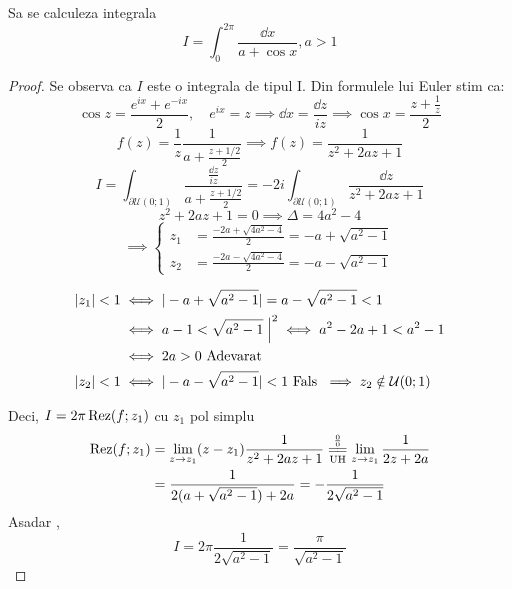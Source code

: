     \begin{aplicatie}
        Sa se calculeza integrala
        \[
            I = \int_{0}^{2 \pi} \frac{\dd x}{a + \cos x}, a>1
        \]
        \begin{proof}
            Se observa ca $I$ este o integrala de tipul $\mathrm{I}$.
            Din formulele lui Euler stim ca:
            \[
                \cos z = \frac{e^{ix}+e^{-ix}}{2}
                , \quad e^{ix} = z \implies \dd x = \frac{\dd z}{iz}
                        \implies \cos x = \frac{z+\frac{1}{z}}{2}
            \]
            \[
                f(z) = \frac{1}{z} \frac{1}{a + \frac{z + 1/2}{2}}
                \implies f(z) = \frac{1}{z^2 + 2az + 1}
            \]
            \[
                I = \int_{\partial\mathcal{U}(0;1)} \frac{\frac{\dd z}{iz}}{a + \frac{z + 1/2}{2}}
                  = - 2i \int_{\partial\mathcal{U}(0;1)} \frac{\dd z}{z^2 + 2az + 1}
            \]
            \[
                z^2 + 2az + 1 = 0 \implies \Delta = 4 a^2 - 4
            \]
            \[
                \implies \left \{
                \begin{aligned}
                    z_1 &= \frac{-2a + \sqrt{4a^2-4}}{2} = -a + \sqrt{a^2 - 1}  \\
                    z_2 &= \frac{-2a - \sqrt{4a^2-4}}{2} = -a - \sqrt{a^2 - 1}
                \end{aligned}
                \right .
            \]

            \begin{align*}
                |z_1| < 1 &\iff |-a + \sqrt{a^2 - 1 }| = a - \sqrt{a^2 -1} < 1 \\
                          &\iff a-1 < \sqrt{a^2 -1} \; \Big{|}^2 \iff a^2 - 2a + 1 < a^2 -1 \\
                          &\iff 2a > 0 \text { Adevarat }     \\
                |z_2| < 1 &\iff |-a - \sqrt{a^2 - 1 }| < 1 \text{ Fals }
                \implies z_2 \notin \mathcal{U}(0;1)
            \end{align*}

            Deci, $I = 2 \pi \operatorname{Rez}(f;z_1)$ cu $z_1$ pol simplu
            \begin{align*}
               \Rez(f;z_1)
                    &= \lim_{z\to z_1}(z-z_1)\frac{1}{z^2+2az+1}
                        \EqConformCaz
                        \lim_{z\to z_1}\frac{1}{2z+2a} \\
                    &= \frac{1}{2(a+\sqrt{a^2 - 1}) + 2a} = - \frac{1}{2\sqrt{a^2-1}}
            \end{align*}
            Asadar ,
            \[
                I = 2 \pi \frac{1}{2\sqrt{a^2 -1}} = \frac{\pi}{\sqrt{a^2-1}}
            \]
        \end{proof}
    \end{aplicatie}

